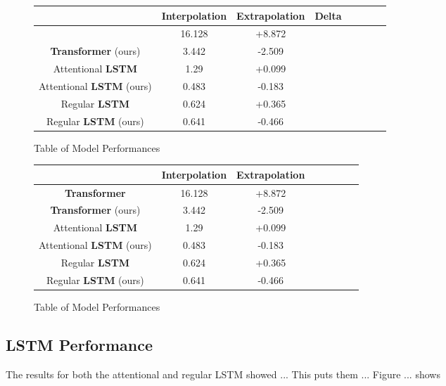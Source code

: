 \begin{figure}[h]
\centering
\begin{tabular}{SSSSSSSS} 
    {} & {\textbf{Interpolation}} & {\textbf{Extrapolation}} & {Delta} \\ \midrule
     & 16.128 & +8.872  \\
    \textbf{Transformer} (ours)   & 3.442  & -2.509  \\ \midrule
    Attentional \textbf{LSTM}  & 1.29   & +0.099 \\
    Attentional \textbf{LSTM} (ours)  & 0.483  & -0.183 \\ \midrule
    Regular \textbf{LSTM}  & 0.624  & +0.365 \\ 
    Regular \textbf{LSTM} (ours)  & 0.641  & -0.466  \\ \bottomrule
\end{tabular}
\caption{Table of Model Performances}
\end{figure}


\begin{figure}[h]
\centering
\begin{tabular}{SSSSSSSS} 
    {} & {\textbf{Interpolation}} & {\textbf{Extrapolation}} \\ \midrule
    \textbf{Transformer}  & 16.128 & +8.872  \\
    \textbf{Transformer} (ours)   & 3.442  & -2.509  \\ \midrule
    Attentional \textbf{LSTM}  & 1.29   & +0.099 \\
    Attentional \textbf{LSTM} (ours)  & 0.483  & -0.183 \\ \midrule
    Regular \textbf{LSTM}  & 0.624  & +0.365 \\ 
    Regular \textbf{LSTM} (ours)  & 0.641  & -0.466  \\ \bottomrule
\end{tabular}
\caption{Table of Model Performances}
\end{figure}

\subsection{LSTM Performance}

The results for both the attentional and regular LSTM showed ... This puts them ... Figure ... shows 


